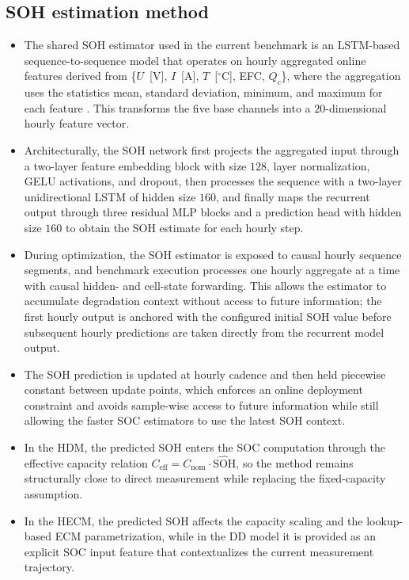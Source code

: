 \documentclass[review]{elsarticle}
\begin{document}
\subsection{SOH estimation method}
\begin{itemize}[leftmargin=*]
    \item The shared SOH estimator used in the current benchmark is an LSTM-based sequence-to-sequence model that operates on hourly aggregated online features derived from \{$U$~[V], $I$~[A], $T$~[$^\circ$C], EFC, $Q_c$\}, where the aggregation uses the statistics mean, standard deviation, minimum, and maximum for each feature \cite{Embedded_AI_SOH_badData,gouEnsembleLearningBasedDataDriven2021,liOnlineCapacityEstimation2021,rzepkaNeuralNetworkArchitecture2023a}. This transforms the five base channels into a $20$-dimensional hourly feature vector.
    \item Architecturally, the SOH network first projects the aggregated input through a two-layer feature embedding block with size $128$, layer normalization, GELU activations, and dropout, then processes the sequence with a two-layer unidirectional LSTM of hidden size $160$, and finally maps the recurrent output through three residual MLP blocks and a prediction head with hidden size $160$ to obtain the SOH estimate for each hourly step.
    \item During optimization, the SOH estimator is exposed to causal hourly sequence segments, and benchmark execution processes one hourly aggregate at a time with causal hidden- and cell-state forwarding. This allows the estimator to accumulate degradation context without access to future information; the first hourly output is anchored with the configured initial SOH value before subsequent hourly predictions are taken directly from the recurrent model output.
    \item The SOH prediction is updated at hourly cadence and then held piecewise constant between update points, which enforces an online deployment constraint and avoids sample-wise access to future information while still allowing the faster SOC estimators to use the latest SOH context.
    \item In the HDM, the predicted SOH enters the SOC computation through the effective capacity relation $C_{\mathrm{eff}} = C_{\mathrm{nom}} \cdot \widehat{\mathrm{SOH}}$, so the method remains structurally close to direct measurement while replacing the fixed-capacity assumption.
    \item In the HECM, the predicted SOH affects the capacity scaling and the lookup-based ECM parametrization, while in the DD model it is provided as an explicit SOC input feature that contextualizes the current measurement trajectory.
\end{itemize}
\end{document}
